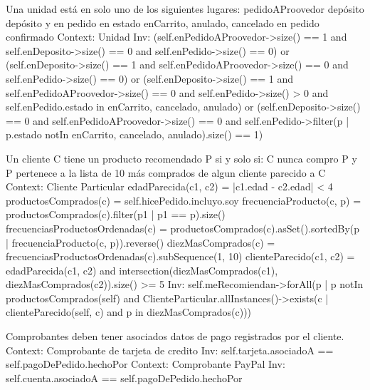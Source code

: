 \begin{listocl}
  \begin{itemocl}{
      Una unidad está en solo uno de los siguientes lugares:
          pedidoAProovedor
          depósito
          depósito y en pedido en estado enCarrito, anulado, cancelado
          en pedido confirmado
    }
Context: Unidad
Inv:
(self.enPedidoAProovedor->size() == 1 and self.enDeposito->size() == 0 and self.enPedido->size() == 0)
or
(self.enDeposito->size() == 1 and self.enPedidoAProovedor->size() == 0 and self.enPedido->size() == 0)
or
(self.enDeposito->size() == 1 and self.enPedidoAProovedor->size() == 0 and self.enPedido->size() > 0 and self.enPedido.estado in {enCarrito, cancelado, anulado})
or
(self.enDeposito->size() == 0 and self.enPedidoAProovedor->size() == 0 and self.enPedido->filter(p | p.estado notIn {enCarrito, cancelado, anulado}).size() == 1)
  \end{itemocl}

  \begin{itemocl}{
      Un cliente C tiene un producto recomendado P si y solo si:
          C nunca compro P y
          P pertenece a la lista de 10 más comprados de algun cliente parecido a C
    }
Context: Cliente Particular
edadParecida(c1, c2) = |c1.edad - c2.edad| < 4
productosComprados(c) = self.hicePedido.incluyo.soy
frecuenciaProducto(c, p) = productosComprados(c).filter(p1 | p1 == p).size()
frecuenciasProductosOrdenadas(c) = productosComprados(c).asSet().sortedBy(p | frecuenciaProducto(c, p)).reverse()
diezMasComprados(c) = frecuenciasProductosOrdenadas(c).subSequence(1, 10)
clienteParecido(c1, c2) = edadParecida(c1, c2) and intersection(diezMasComprados(c1), diezMasComprados(c2)).size() >= 5
Inv: self.meRecomiendan->forAll(p | p notIn productosComprados(self) and ClienteParticular.allInstances()->exists(c | clienteParecido(self, c) and p in diezMasComprados(c)))
  \end{itemocl}

  \begin{itemocl}{Comprobantes deben tener asociados datos de pago registrados por el cliente.}
Context: Comprobante de tarjeta de credito
Inv: self.tarjeta.asociadoA == self.pagoDePedido.hechoPor
Context: Comprobante PayPal
Inv: self.cuenta.asociadoA == self.pagoDePedido.hechoPor
  \end{itemocl}
\end{listocl}
